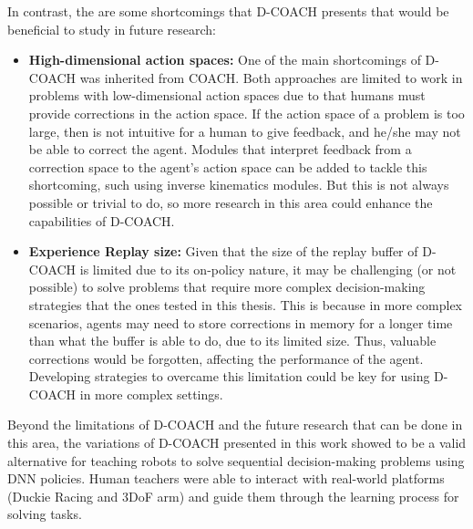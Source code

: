 \begin{conclusion}
In contrast, the are some shortcomings that D-COACH presents that would be beneficial to study in future research:
\begin{itemize}
    \item \textbf{High-dimensional action spaces:} One of the main shortcomings of D-COACH was inherited from COACH. Both approaches are limited to work in problems with low-dimensional action spaces due to that humans must provide corrections in the action space. If the action space of a problem is too large, then is not intuitive for a human to give feedback, and he/she may not be able to correct the agent. Modules that interpret feedback from a correction space to the agent's action space can be added to tackle this shortcoming, such using inverse kinematics modules. But this is not always possible or trivial to do, so more research in this area could  enhance the capabilities of D-COACH.
    \item \textbf{Experience Replay size:} Given that the size of the replay buffer of D-COACH is limited due to its on-policy nature, it may be challenging (or not possible) to solve problems that require more complex decision-making strategies that the ones tested in this thesis. This is because in more complex scenarios, agents may need to store corrections in memory for a longer time than what the buffer is able to do, due to its limited size. Thus, valuable corrections would be forgotten, affecting the performance of the agent. Developing strategies to overcame this limitation could be key for using D-COACH in more complex settings. 
\end{itemize}

Beyond the limitations of D-COACH and the future research that can be done in this area, the variations of D-COACH presented in this work showed to be a valid alternative for teaching robots to solve sequential decision-making problems using DNN policies. Human teachers were able to interact with real-world platforms (Duckie Racing and 3DoF arm) and guide them through the learning process for solving tasks.
\end{conclusion}
